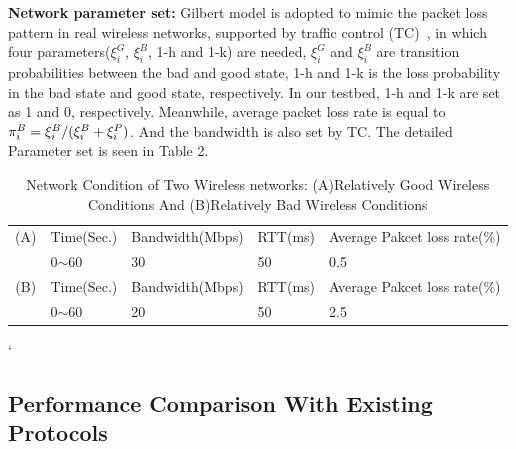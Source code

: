 \textbf{Network parameter set:} Gilbert model is adopted to mimic the packet loss pattern in real wireless networks, supported by traffic control (TC)~\cite{TC}, in which four parameters($\xi _i^G$, $\xi _i^B$, 1-h and 1-k) are needed, $\xi _i^G$ and $\xi _i^B$ are transition probabilities between the bad and good state, 1-h and 1-k is the loss probability in the bad state and good state, respectively. In our testbed, 1-h and 1-k are set as 1 and 0, respectively. Meanwhile, average packet loss rate is equal to $\pi _i^B = \xi _i^B/(\xi _i^B\\ + \xi _i^P)$. And the bandwidth is also set by TC. The detailed Parameter set is seen in Table 2. 

\begin{table}
	\centering 
	\scriptsize
	\begin{tabular}{cp{1.0cm}p{1.6cm}p{0.8cm}p{2.3cm}}
		\rowcolor[gray]{0.9} 
		\hline
		(A)  &  Time(Sec.)    & Bandwidth(Mbps)       &  RTT(ms) &  Average Pakcet loss rate(\%) \\

		
		&  0${\sim}$60   &  30         &    50    &  0.5 \\

		\hline
		\rowcolor[gray]{0.9}
		\hline
		(B)  &   Time(Sec.)   & Bandwidth(Mbps)       &  RTT(ms) &     Average Pakcet loss rate(\%)  \\
		
		&  0${\sim}$60   &  20         &    50    &  2.5\\
		
		\hline
		
	\end{tabular}
	\caption{Network Condition of Two Wireless networks: (A)Relatively Good Wireless Conditions And (B)Relatively Bad Wireless Conditions}
	\label{}
\end{table}
`
\subsection{Performance Comparison With Existing Protocols}

